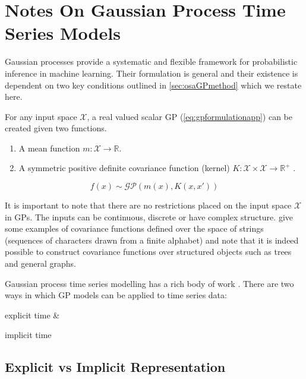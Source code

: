 \chapter{Notes On Gaussian Process Time Series Models}\label{app:gpNARX}

Gaussian processes provide a systematic and flexible framework for probabilistic inference in machine learning. 
Their formulation is general and their existence is dependent on two key conditions outlined in \cref{sec:osaGPmethod} 
which we restate here.

For any input space $\mathcal{X}$, a real valued scalar GP (\cref{eq:gpformulationapp}) can be created given two functions.

\begin{enumerate}
    \item A mean function $m: \mathcal{X} \longrightarrow \mathbb{R}$.
    \item A symmetric positive definite covariance function (kernel) 
    $K: \mathcal{X} \times \mathcal{X} \longrightarrow \mathbb{R}^{+}$ \citep[ch.~1\&2]{Berlinet2004}.
\end{enumerate}    

\begin{equation}\label{eq:gpformulationapp}
    f(x) \sim \mathcal{GP}(m(x), K(x, x'))
\end{equation}

It is important to note that there are no restrictions placed on the input space $\mathcal{X}$ in GPs. The inputs 
can be continuous, discrete or have complex structure. \citet[ch.~4, sec.~4.4]{Rasmussen:2005:GPM:1162254} give 
some examples of covariance functions defined over the space of strings (sequences of characters drawn from a 
finite alphabet) and note that it is indeed possible to construct covariance functions over structured objects 
such as trees and general graphs. 

Gaussian process time series modelling has a rich body of work \citep{turner2012gaussian,frigola2016bayesian}. There 
are two ways in which GP models can be applied to time series data: \begin{enumerate*} \item explicit time \& \item implicit time \end{enumerate*}

\section*{Explicit vs Implicit Representation}

